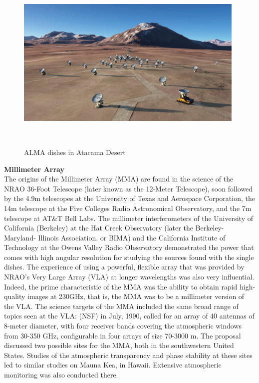 \begin{figure}[H]
\centering
\includegraphics[width=11cm,height=8cm]{images/alma.jpg}\\
\caption{ALMA dishes in Atacama Desert}
\end{figure}


\textbf{Millimeter Array} \\

The origins of the Millimeter Array (MMA) are found in the science of the NRAO 36-Foot Telescope (later known as the 12-Meter Telescope), soon followed by the 4.9m telescopes at the University of Texas and Aerospace Corporation, the 14m telescope at the Five Colleges Radio Astronomical Observatory, and the 7m telescope at AT\&T Bell Labs. The millimeter interferometers of the University of California (Berkeley) at the Hat Creek Observatory (later the Berkeley-Maryland- Illinois Association, or BIMA) and the California Institute of Technology at the Owens Valley Radio Observatory demonstrated the power that comes with high angular resolution for studying the sources found with the single dishes. The experience of using a powerful, flexible array that was provided by NRAO’s Very Large Array (VLA) at longer wavelengths was also very influential. Indeed, the prime characteristic of the MMA was the ability to obtain rapid high-quality images at 230GHz, that is, the MMA was to be a millimeter version of the VLA. The science targets of the MMA included the same broad range of topics seen at the VLA: (NSF) in July, 1990, called for an array of 40 antennas of 8-meter diameter, with four receiver bands covering the atmospheric windows from 30-350 GHz, configurable in four arrays of size 70-3000 m. The proposal discussed two possible sites for the MMA, both in the southwestern United States. Studies of the atmospheric transparency and phase stability at these sites led to similar studies on Mauna Kea, in Hawaii. Extensive atmospheric monitoring was also conducted there.\\


